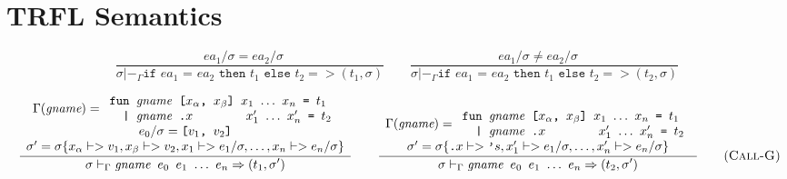 \documentclass[10pt]{../sigplanconf}
\newcommand{\nfrac}[2]{\frac{\displaystyle{#1}}{\displaystyle{#2}}}
\newcommand{\tagsc}[1]{\tag{\scshape #1}}
\begin{document}
\section{TRFL Semantics}
\begin{figure*}\centering
  \begin{equation}
    \nfrac{
      ea_1/ \sigma = ea_2/\sigma \quad
    }{
      \sigma |-_\Gamma \texttt{if $ea_1$ = $ea_2$ then $t_1$ else $t_2$} => (t_1, \sigma)
    }
    \qquad
    \nfrac{
      ea_1/ \sigma \neq ea_2/\sigma \quad
    }{
      \sigma |-_\Gamma \texttt{if $ea_1$ = $ea_2$ then $t_1$ else $t_2$} => (t_2, \sigma)
    } \tagsc{If}
\end{equation}

\begin{equation}
\hspace{-0.7cm}
  \nfrac{
    \begin{array}{c}
      \Gamma(\textit{gname}) =
      \begin{array}{l}
        \texttt{fun \textit{\rmfamily gname} [$x_\alpha$, $x_\beta$] $x_1$ $\ldots$ $x_n$ = $t_1$} \\
        \texttt{\ \ | \textit{\rmfamily gname}\ \texttt{.}$x$ \hspace{1.1cm} $x_1'$ $\ldots$ $x_n'$ = $t_2$} \\
      \end{array} \\
      e_0/\sigma = \texttt{[$v_1$, $v_2$]} \\
      \sigma' = \sigma\{x_\alpha |-> v_1, x_\beta |-> v_2, x_1 |-> e_1/\sigma, \ldots, x_n |-> e_n/\sigma\} 
    \end{array}
  }{
    \sigma |-_\Gamma \texttt{\textit{\rmfamily gname} $e_0$ $e_1$ $\ldots$ $e_n$} => (t_1, \sigma')
  }
\qquad
  \nfrac{
    \begin{array}{c}
      \Gamma(\textit{gname}) =
      \begin{array}{l}
        \texttt{fun \textit{\rmfamily gname} [$x_\alpha$, $x_\beta$] $x_1$ $\ldots$ $x_n$ = $t_1$} \\
        \texttt{\ \ | \textit{\rmfamily gname}\ \texttt{.}$x$ \hspace{1.1cm} $x_1'$ $\ldots$ $x_n'$ = $t_2$} \\
      \end{array} \\
      \sigma' = \sigma\{\texttt{.}x |-> \texttt{'}s, x_1' |-> e_1/\sigma, \ldots, x_n' |-> e_n/\sigma\}
    \end{array}
  }{
    \sigma |-_\Gamma \texttt{\textit{\rmfamily gname} $e_0$ $e_1$ $\ldots$ $e_n$} => (t_2, \sigma')
  }
  \tagsc{Call-G}
\end{equation}


\end{figure*}
\end{document}
